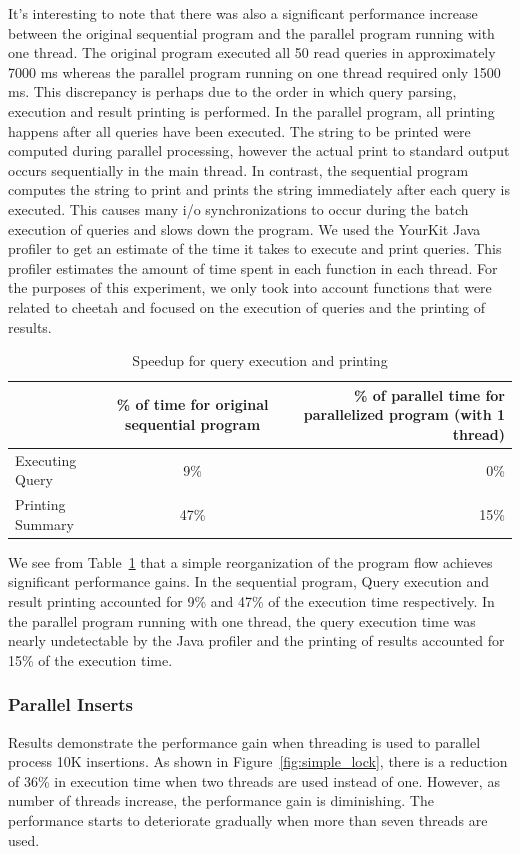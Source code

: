 \documentclass[11pt,journal,compsoc]{IEEEtran}
\begin{document}
It’s interesting to note that there was also a significant performance increase between the original sequential program and the parallel program running with one thread. The original program executed all 50 read queries in approximately 7000 ms whereas the parallel program running on one thread required only 1500 ms. This discrepancy is perhaps due to the order in which query parsing, execution and result printing is performed. In the parallel program, all printing happens after all queries have been executed. The string to be printed were computed during parallel processing, however the actual print to standard output occurs sequentially in the main thread. In contrast, the sequential program computes the string to print and prints the string immediately after each query is executed. This causes many i/o synchronizations to occur during the batch execution of queries and slows down the program. We used the YourKit Java profiler to get an estimate of the time it takes to execute and print queries. This profiler estimates the amount of time spent in each function in each thread. For the purposes of this experiment, we only took into account functions that were related to cheetah and focused on the execution of queries and the printing of results.

\begin{table}
  \centering
  \begin{tabular}{ |l || c | r |}
    \hline
     & \% of time for original sequential program & \% of parallel time for parallelized program (with 1 thread) \\ \hline\hline
    Executing Query & 9\% & ~0\% \\ \hline
    Printing Summary & 47\% & 15\% \\
    \hline

  \end{tabular}
\caption{Speedup for query execution and printing}
\label{table:speedup}
\end{table}


We see from Table~\ref{table:speedup} that a simple reorganization of the program flow achieves significant performance gains. In the sequential program, Query execution and result printing accounted for 9\% and 47\% of the execution time respectively. In the parallel program running with one thread, the query execution time was nearly undetectable by the Java profiler and the printing of results accounted for 15\% of the execution time. 


\subsubsection{Parallel Inserts}
Results demonstrate the performance gain when threading is used to parallel process 10K insertions. As shown in Figure~\ref{fig:simple_lock}, there is a reduction of 36\% in execution time when two threads are used instead of one. However, as number of threads increase, the performance gain is diminishing. The performance starts to deteriorate gradually when more than seven threads are used.
\end{document}
